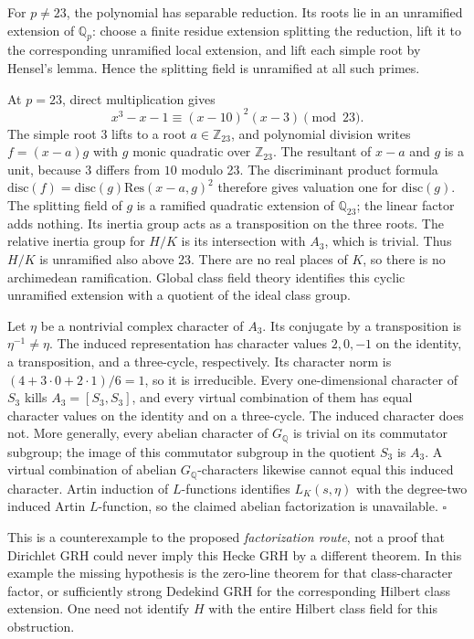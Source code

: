 For \(p\ne23\), the polynomial has separable reduction. Its roots lie in
an unramified extension of \(\mathbb Q_p\): choose a finite residue
extension splitting the reduction, lift it to the corresponding
unramified local extension, and lift each simple root by Hensel's lemma.
Hence the splitting field is unramified at all such primes.

At \(p=23\), direct multiplication gives \[
 x^3-x-1\equiv(x-10)^2(x-3)\pmod{23}.
\] The simple root \(3\) lifts to a root \(a\in\mathbb Z_{23}\), and
polynomial division writes \(f=(x-a)g\) with \(g\) monic quadratic over
\(\mathbb Z_{23}\). The resultant of \(x-a\) and \(g\) is a unit,
because \(3\) differs from \(10\) modulo 23. The discriminant product
formula \(\mathrm{disc}(f)=\mathrm{disc}(g)\mathrm{Res}(x-a,g)^2\)
therefore gives valuation one for \(\mathrm{disc}(g)\). The splitting
field of \(g\) is a ramified quadratic extension of \(\mathbb Q_{23}\);
the linear factor adds nothing. Its inertia group acts as a
transposition on the three roots. The relative inertia group for \(H/K\)
is its intersection with \(A_3\), which is trivial. Thus \(H/K\) is
unramified also above 23. There are no real places of \(K\), so there is
no archimedean ramification. Global class field theory identifies this
cyclic unramified extension with a quotient of the ideal class group.

Let \(\eta\) be a nontrivial complex character of \(A_3\). Its conjugate
by a transposition is \(\eta^{-1}\ne\eta\). The induced representation
has character values \(2,0,-1\) on the identity, a transposition, and a
three-cycle, respectively. Its character norm is
\((4+3\cdot0+2\cdot1)/6=1\), so it is irreducible. Every one-dimensional
character of \(S_3\) kills \(A_3=[S_3,S_3]\), and every virtual
combination of them has equal character values on the identity and on a
three-cycle. The induced character does not. More generally, every
abelian character of \(G_\mathbb Q\) is trivial on its commutator
subgroup; the image of this commutator subgroup in the quotient \(S_3\)
is \(A_3\). A virtual combination of abelian \(G_\mathbb Q\)-characters
likewise cannot equal this induced character. Artin induction of
\(L\)-functions identifies \(L_K(s,\eta)\) with the degree-two induced
Artin \(L\)-function, so the claimed abelian factorization is
unavailable. \(\square\)

This is a counterexample to the proposed \emph{factorization route}, not
a proof that Dirichlet GRH could never imply this Hecke GRH by a
different theorem. In this example the missing hypothesis is the
zero-line theorem for that class-character factor, or sufficiently
strong Dedekind GRH for the corresponding Hilbert class extension. One
need not identify \(H\) with the entire Hilbert class field for this
obstruction.

